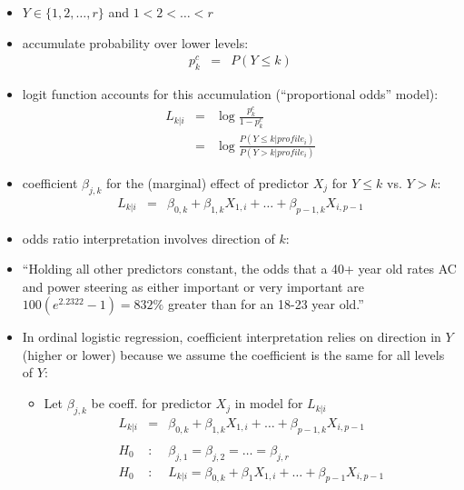 \documentclass[12pt]{../notes}
\begin{document}
\begin{itemize}
  \item $Y \in \{1, 2, \ldots, r \}$ and $1 < 2 < \ldots < r$
  \item accumulate probability over lower levels:
    \begin{eqnarray}
      p_k^c & = & P( Y \leq k ) \nonumber
    \end{eqnarray}
  \item  logit function accounts for this accumulation (``proportional odds'' model):
    \begin{eqnarray}
      L_{k|i} & = &  \log \frac{p_k^c}{1 - p_k^c} \nonumber \\
       & = & \log \frac{P(Y \leq k | profile_i)}{ P(Y > k | profile_i)} \nonumber
    \end{eqnarray}
  \item coefficient $\beta_{j,k}$ for the (marginal) effect of predictor $X_j$ for $Y \leq k$ vs. $Y > k$:
      \begin{eqnarray}
        L_{k|i} & = & \beta_{0,k} + \beta_{1,k} X_{1,i} + \ldots + \beta_{p-1,k} X_{i,p-1}
         \nonumber
      \end{eqnarray}
  \item odds ratio interpretation involves direction of $k$:
  \bi
  \item  ``Holding all other predictors constant, the odds that a 40+ year old rates AC and power steering as either important or very important are $100(e^{2.2322} - 1) = 832\%$ greater than for an 18-23 year old.''
  \ei
  \item In ordinal logistic regression, coefficient interpretation relies on direction in $Y$ (higher or lower) because we assume the coefficient is the same for all levels of $Y$:
        \begin{itemize}
          \item Let $\beta_{j,k}$ be coeff. for predictor $X_j$ in model for $L_{k|i}$
                \begin{eqnarray}
                   L_{k|i} & = & \beta_{0,k} + \beta_{1,k} X_{1,i} + \ldots + \beta_{p-1,k} X_{i,p-1} \nonumber \\
                   & & \nonumber \\
                   H_0 & : & \beta_{j,1} = \beta_{j,2} = \ldots = \beta_{j,r} \nonumber \\
                   H_0 & : & L_{k|i}  =  \beta_{0,k} + \beta_{1} X_{1,i} + \ldots + \beta_{p-1} X_{i,p-1} \nonumber
                \end{eqnarray}
        \end{itemize}
\end{itemize}



\end{document}
